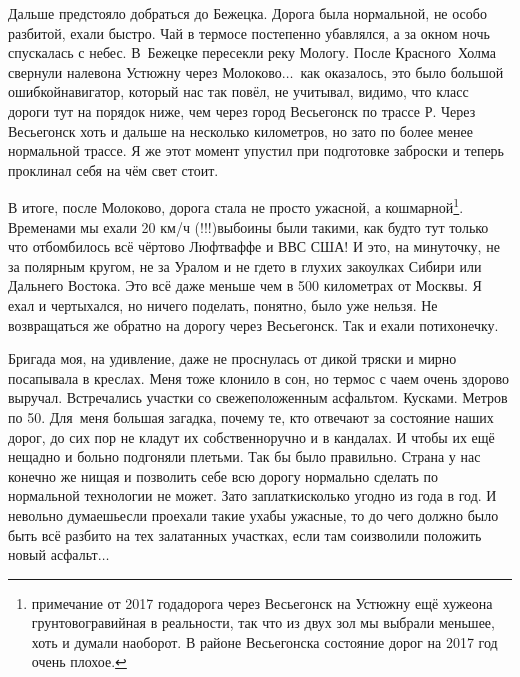 Дальше предстояло добраться до Бежецка. Дорога была нормальной, не особо разбитой, ехали быстро. Чай в термосе постепенно убавлялся, а за окном ночь спускалась с небес. В~Бежецке пересекли реку Мологу. После Красного~Холма свернули налево\mdash на Устюжну через Молоково$\ldots$~как оказалось, это было большой ошибкой\mdash навигатор, который нас так повёл, не учитывал, видимо, что класс дороги тут на порядок ниже, чем через город Весьегонск по трассе Р. Через Весьегонск хоть и дальше на несколько километров, но зато по более менее нормальной трассе. Я же этот момент упустил при подготовке заброски и теперь проклинал себя на чём свет стоит.


В итоге, после Молоково, дорога стала не просто ужасной, а кошмарной\footnote{примечание от 2017 года\mdash дорога через Весьегонск на Устюжну ещё хуже\mdash она грунтово\sdash гравийная в реальности, так что из двух зол мы выбрали меньшее, хоть и думали наоборот. В районе Весьегонска состояние дорог на 2017 год очень плохое.}. Временами мы ехали 20 км/ч (!!!)\mdash выбоины были такими, как будто тут только что отбомбилось всё чёртово Люфтваффе и ВВС США! И это, на минуточку, не за полярным кругом, не за Уралом и не где\sdash то в глухих закоулках Сибири или Дальнего Востока. Это всё даже меньше чем в 500 километрах от Москвы. Я ехал и чертыхался, но ничего поделать, понятно, было уже нельзя. Не возвращаться же обратно на дорогу через Весьегонск. Так и ехали потихонечку. 

Бригада моя, на удивление, даже не проснулась от дикой тряски и мирно посапывала в креслах. Меня тоже клонило в сон, но термос с чаем очень здорово выручал. Встречались участки со свежеположенным асфальтом. Кусками. Метров по 50. Для~меня большая загадка, почему те, кто отвечают за состояние наших дорог, до сих пор не кладут их собственноручно и в кандалах. И чтобы их ещё нещадно и больно подгоняли плетьми. Так бы было правильно. Страна у нас конечно же нищая и позволить себе всю дорогу нормально сделать по нормальной технологии не может. Зато заплатки\mdash сколько угодно из года в год. И невольно думаешь\mdash если проехали такие ухабы ужасные, то до чего должно было быть всё разбито на тех залатанных участках, если там соизволили положить новый асфальт$\ldots$ 
 
